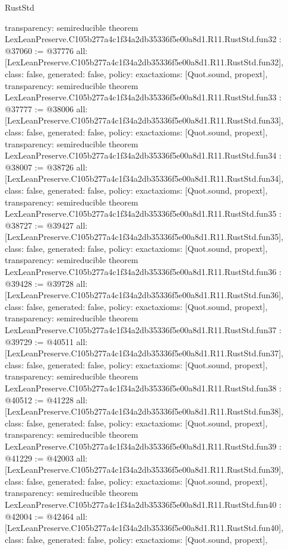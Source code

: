 \begin{lexlean}{RustStd}
\begin{coremodule}
{  transparency: semireducible
}
theorem LexLeanPreserve.C105b277a4c1f34a2db35336f5e00a8d1.R11.RustStd.fun32 : @37060 := @37776 {
  all: [LexLeanPreserve.C105b277a4c1f34a2db35336f5e00a8d1.R11.RustStd.fun32],
  class: false,
  generated: false,
  policy: exact{axioms: [Quot.sound, propext]},
  transparency: semireducible
}
theorem LexLeanPreserve.C105b277a4c1f34a2db35336f5e00a8d1.R11.RustStd.fun33 : @37777 := @38006 {
  all: [LexLeanPreserve.C105b277a4c1f34a2db35336f5e00a8d1.R11.RustStd.fun33],
  class: false,
  generated: false,
  policy: exact{axioms: [Quot.sound, propext]},
  transparency: semireducible
}
theorem LexLeanPreserve.C105b277a4c1f34a2db35336f5e00a8d1.R11.RustStd.fun34 : @38007 := @38726 {
  all: [LexLeanPreserve.C105b277a4c1f34a2db35336f5e00a8d1.R11.RustStd.fun34],
  class: false,
  generated: false,
  policy: exact{axioms: [Quot.sound, propext]},
  transparency: semireducible
}
theorem LexLeanPreserve.C105b277a4c1f34a2db35336f5e00a8d1.R11.RustStd.fun35 : @38727 := @39427 {
  all: [LexLeanPreserve.C105b277a4c1f34a2db35336f5e00a8d1.R11.RustStd.fun35],
  class: false,
  generated: false,
  policy: exact{axioms: [Quot.sound, propext]},
  transparency: semireducible
}
theorem LexLeanPreserve.C105b277a4c1f34a2db35336f5e00a8d1.R11.RustStd.fun36 : @39428 := @39728 {
  all: [LexLeanPreserve.C105b277a4c1f34a2db35336f5e00a8d1.R11.RustStd.fun36],
  class: false,
  generated: false,
  policy: exact{axioms: [Quot.sound, propext]},
  transparency: semireducible
}
theorem LexLeanPreserve.C105b277a4c1f34a2db35336f5e00a8d1.R11.RustStd.fun37 : @39729 := @40511 {
  all: [LexLeanPreserve.C105b277a4c1f34a2db35336f5e00a8d1.R11.RustStd.fun37],
  class: false,
  generated: false,
  policy: exact{axioms: [Quot.sound, propext]},
  transparency: semireducible
}
theorem LexLeanPreserve.C105b277a4c1f34a2db35336f5e00a8d1.R11.RustStd.fun38 : @40512 := @41228 {
  all: [LexLeanPreserve.C105b277a4c1f34a2db35336f5e00a8d1.R11.RustStd.fun38],
  class: false,
  generated: false,
  policy: exact{axioms: [Quot.sound, propext]},
  transparency: semireducible
}
theorem LexLeanPreserve.C105b277a4c1f34a2db35336f5e00a8d1.R11.RustStd.fun39 : @41229 := @42003 {
  all: [LexLeanPreserve.C105b277a4c1f34a2db35336f5e00a8d1.R11.RustStd.fun39],
  class: false,
  generated: false,
  policy: exact{axioms: [Quot.sound, propext]},
  transparency: semireducible
}
theorem LexLeanPreserve.C105b277a4c1f34a2db35336f5e00a8d1.R11.RustStd.fun40 : @42004 := @42464 {
  all: [LexLeanPreserve.C105b277a4c1f34a2db35336f5e00a8d1.R11.RustStd.fun40],
  class: false,
  generated: false,
  policy: exact{axioms: [Quot.sound, propext]},
}
\end{coremodule}
\end{lexlean}
